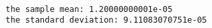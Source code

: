 \documentclass[a4paper,dvipdfmx]{jsarticle}
\newlength{\cellleftmargin}
\newlength{\smallerfontscale}
\def\smaller{\fontsize{\smallerfontscale}{\smallerfontscale}\selectfont}
\begin{document}
\par\vspace{1\smallerfontscale}%
    \begin{addmargin}[\cellleftmargin]{0em}%
    {\smaller%
    \vspace{-1\smallerfontscale}%
    
    \begin{center}
    \end{center}
    { \hspace*{\fill} \\}
    }%
    \end{addmargin}%
    \begin{addmargin}[\cellleftmargin]{0em}%
    {\smaller%
    \vspace{-1\smallerfontscale}%
    
    \begin{Verbatim}[commandchars=\\\{\}]
the sample mean: 1.20000000001e-05
the standard deviation: 9.11083070751e-05

    \end{Verbatim}
}%
    \end{addmargin}%
    \begin{addmargin}[\cellleftmargin]{0em}%
    {\smaller%
    \vspace{-1\smallerfontscale}%
    
    \begin{center}
    \end{center}
    { \hspace*{\fill} \\}
    }%
    \end{addmargin}%
\end{document}
